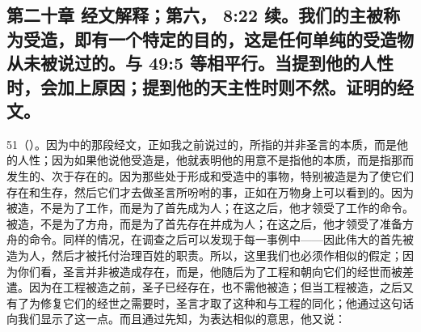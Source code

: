 \subsection{第二十章 经文解释；第六， 8:22 续。我们的主被称为受造，即有一个特定的目的，这是任何单纯的受造物从未被说过的。与  49:5 等相平行。当提到他的人性时，会加上原因；提到他的天主性时则不然。证明的经文。}

51（）。因为中的那段经文，正如我之前说过的，所指的并非圣言的本质，而是他的人性；因为如果他说他受造是，他就表明他的用意不是指他的本质，而是指那而发生的、次于存在的。因为那些处于形成和受造中的事物，特别被造是为了使它们存在和生存，然后它们才去做圣言所吩咐的事，正如在万物身上可以看到的。因为被造，不是为了工作，而是为了首先成为人；在这之后，他才领受了工作的命令。被造，不是为了方舟，而是为了首先存在并成为人；在这之后，他才领受了准备方舟的命令。同样的情况，在调查之后可以发现于每一事例中——因此伟大的首先被造为人，然后才被托付治理百姓的职责。所以，这里我们也必须作相似的假定；因为你们看，圣言并非被造成存在，而是，他随后为了工程和朝向它们的经世而被差遣。因为在工程被造之前，圣子已经存在，也不需他被造；但当工程被造，之后又有了为修复它们的经世之需要时，圣言才取了这种和与工程的同化；他通过这句话向我们显示了这一点。而且通过先知，为表达相似的意思，他又说：\par


